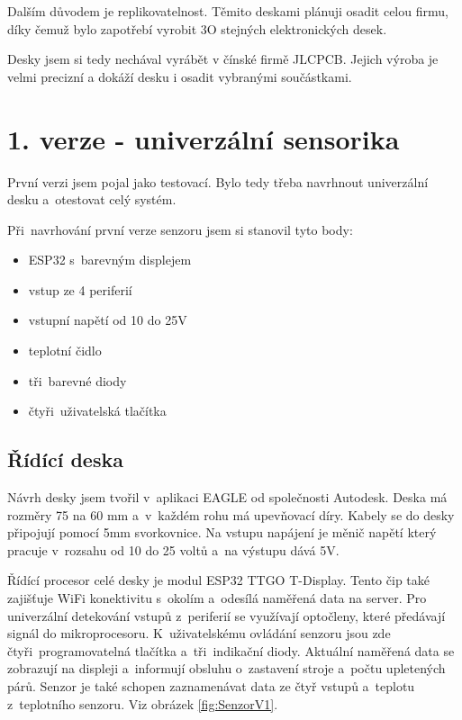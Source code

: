Dalším důvodem je replikovatelnost. Těmito deskami plánuji osadit celou firmu, díky čemuž bylo zapotřebí vyrobit 3O stejných elektronických desek.

Desky jsem si tedy nechával vyrábět v čínské firmě JLCPCB. Jejich výroba je velmi precizní a dokáží desku i osadit vybranými součástkami.



\section{1. verze - univerzální sensorika}

První verzi jsem pojal jako testovací. Bylo tedy třeba navrhnout univerzální desku a~otestovat celý systém.\newline

Při~navrhování první verze senzoru jsem si stanovil tyto body:
\begin{itemize}
    \item ESP32 s~barevným displejem
    \item vstup ze 4 periferií
    \item vstupní napětí od 10 do 25V
    \item teplotní čidlo
    \item tři~barevné diody
    \item čtyři~uživatelská tlačítka
\end{itemize}


\subsection{Řídící deska}
Návrh desky jsem tvořil v~aplikaci EAGLE od společnosti Autodesk. 
Deska má rozměry 75 na 60 mm a~v~každém rohu má upevňovací díry. 
Kabely se do desky připojují pomocí 5mm svorkovnice.
Na vstupu napájení je měnič napětí který pracuje v~rozsahu od 10 do 25 voltů a~na výstupu dává 5V. 

Řídící procesor celé desky je modul ESP32 TTGO T-Display.
Tento čip také zajišťuje WiFi konektivitu s~okolím a~odesílá naměřená data na server.
Pro univerzální detekování vstupů z~periferií se využívají optočleny, které předávají signál do mikroprocesoru.
K~uživatelskému ovládání senzoru jsou zde čtyři~programovatelná tlačítka a~tři~indikační diody.
Aktuální naměřená data se zobrazují na displeji a~informují obsluhu o~zastavení stroje a~počtu upletených párů.
Senzor je také schopen zaznamenávat data ze čtyř vstupů a~teplotu z~teplotního senzoru. Viz obrázek \ref{fig:SenzorV1}.

